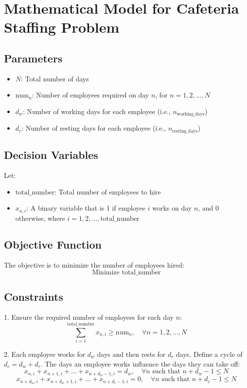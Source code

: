 \documentclass{article}
\begin{document}
\section*{Mathematical Model for Cafeteria Staffing Problem}

\subsection*{Parameters}
\begin{itemize}
    \item \( N \): Total number of days
    \item \( \text{num}_n \): Number of employees required on day \( n \), for \( n = 1, 2, \ldots, N \)
    \item \( d_w \): Number of working days for each employee (i.e., \( n_{\text{working\_days}} \))
    \item \( d_r \): Number of resting days for each employee (i.e., \( n_{\text{resting\_days}} \))
\end{itemize}

\subsection*{Decision Variables}
Let:
\begin{itemize}
    \item \( \text{total\_number} \): Total number of employees to hire
    \item \( x_{n,i} \): A binary variable that is 1 if employee \( i \) works on day \( n \), and 0 otherwise, where \( i = 1, 2, \ldots, \text{total\_number} \)
\end{itemize}

\subsection*{Objective Function}
The objective is to minimize the number of employees hired:
\[
\text{Minimize } \text{total\_number}
\]

\subsection*{Constraints}
1. Ensure the required number of employees for each day \( n \):
\[
\sum_{i=1}^{\text{total\_number}} x_{n,i} \geq \text{num}_n, \quad \forall n = 1, 2, \ldots, N
\]

2. Each employee works for \( d_w \) days and then rests for \( d_r \) days. Define a cycle of \( d_c = d_w + d_r \). The days an employee works influence the days they can take off:
\[
x_{n,i} + x_{n+1,i} + \ldots + x_{n+d_w-1,i} = d_w, \quad \forall n \text{ such that } n + d_w - 1 \leq N
\]
\[
x_{n+d_w,i} + x_{n+d_w+1,i} + \ldots + x_{n+d_c-1,i} = 0, \quad \forall n \text{ such that } n + d_c - 1 \leq N
\]
\end{document}
